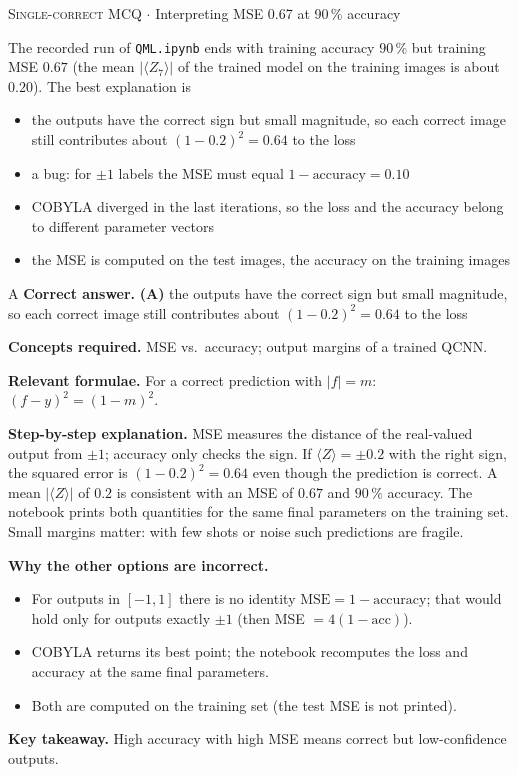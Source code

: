 \documentclass[11pt,a4paper]{article}
\newcommand{\optlabel}[1]{\textbf{(#1)}}
\newcommand{\correctlabel}[1]{\textcolor{okgreen}{\textbf{(#1)}\,\ding{51}}}
\newenvironment{qitem}[1]{\begin{list}{}{\setlength{\leftmargin}{3.3em}\setlength{\labelwidth}{3.1em}%
  \setlength{\labelsep}{0.2em}\setlength{\topsep}{3pt}\setlength{\parsep}{3pt}}\item[\textbf{Q.#1}\hfill]}{\end{list}}
\newcommand{\qsep}{\par\vspace{2pt}{\color{black!15}\hrule}\vspace{4pt}}
\newcommand{\qmeta}[2]{{\footnotesize\color{black!60}\textsc{#1} \;$\cdot$\; #2}\par}
\begin{document}
\begin{qitem}{68}
\qmeta{Single-correct MCQ}{Interpreting MSE 0.67 at 90\,\% accuracy}
The recorded run of \texttt{QML.ipynb} ends with training accuracy $90\,\%$ but training MSE $0.67$ (the mean
$|\langle Z_7\rangle|$ of the trained model on the training images is about $0.20$). The best explanation is
\begin{itemize}[leftmargin=2.6em, labelsep=0.4em, itemsep=2pt, topsep=3pt]
\item[\correctlabel{A}] the outputs have the correct sign but small magnitude, so each correct image still contributes about $(1 - 0.2)^2 = 0.64$ to the loss
\item[\optlabel{B}] a bug: for $\pm1$ labels the MSE must equal $1 - \text{accuracy} = 0.10$
\item[\optlabel{C}] COBYLA diverged in the last iterations, so the loss and the accuracy belong to different parameter vectors
\item[\optlabel{D}] the MSE is computed on the test images, the accuracy on the training images
\end{itemize}
\end{qitem}
\begin{solbox}{A}
\textbf{\color{brand}Correct answer.} \textcolor{okgreen}{\textbf{(A)}} the outputs have the correct sign but small magnitude, so each correct image still contributes about $(1 - 0.2)^2 = 0.64$ to the loss

\textbf{\color{brand}Concepts required.} MSE vs.\ accuracy; output margins of a trained QCNN.

\textbf{\color{brand}Relevant formulae.} For a correct prediction with $|f| = m$: $(f - y)^2 = (1 - m)^2$.

\textbf{\color{brand}Step-by-step explanation.} MSE measures the distance of the real-valued output from $\pm1$; accuracy only checks the sign. If $\langle Z\rangle = \pm0.2$ with the
right sign, the squared error is $(1 - 0.2)^2 = 0.64$ even though the prediction is correct. A mean $|\langle Z\rangle|$ of $0.2$ is
consistent with an MSE of $0.67$ and $90\,\%$ accuracy. The notebook prints both quantities for the same final parameters on the
training set. Small margins matter: with few shots or noise such predictions are fragile.

\textbf{\color{brand}Why the other options are incorrect.}
\begin{itemize}[leftmargin=2.4em, itemsep=1pt, topsep=2pt]
\item[\textbf{(B)}] For outputs in $[-1, 1]$ there is no identity $\text{MSE} = 1 - \text{accuracy}$; that would hold only for outputs exactly $\pm1$ (then MSE $= 4(1 - \text{acc})$).
\item[\textbf{(C)}] COBYLA returns its best point; the notebook recomputes the loss and accuracy at the same final parameters.
\item[\textbf{(D)}] Both are computed on the training set (the test MSE is not printed).
\end{itemize}
\textbf{\color{brand}Key takeaway.} High accuracy with high MSE means correct but low-confidence outputs.
\end{solbox}
\qsep
\end{document}
